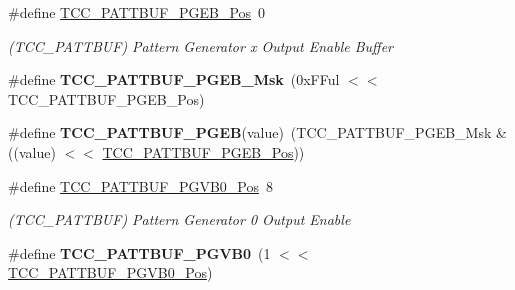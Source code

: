 \begin{DoxyCompactItemize}
\item 
\hypertarget{group___s_a_m_l21___t_c_c_gacee63a425f926cec1b7bbb7d34ebac7e}{}\#define \hyperlink{group___s_a_m_l21___t_c_c_gacee63a425f926cec1b7bbb7d34ebac7e}{T\+C\+C\+\_\+\+P\+A\+T\+T\+B\+U\+F\+\_\+\+P\+G\+E\+B\+\_\+\+Pos}~0\label{group___s_a_m_l21___t_c_c_gacee63a425f926cec1b7bbb7d34ebac7e}

\begin{DoxyCompactList}\small\item\em (T\+C\+C\+\_\+\+P\+A\+T\+T\+B\+U\+F) Pattern Generator x Output Enable Buffer \end{DoxyCompactList}\item 
\hypertarget{group___s_a_m_l21___t_c_c_ga2c604d0b655c841d75ea4f18541478d3}{}\#define {\bfseries T\+C\+C\+\_\+\+P\+A\+T\+T\+B\+U\+F\+\_\+\+P\+G\+E\+B\+\_\+\+Msk}~(0x\+F\+Ful $<$$<$ T\+C\+C\+\_\+\+P\+A\+T\+T\+B\+U\+F\+\_\+\+P\+G\+E\+B\+\_\+\+Pos)\label{group___s_a_m_l21___t_c_c_ga2c604d0b655c841d75ea4f18541478d3}

\item 
\hypertarget{group___s_a_m_l21___t_c_c_ga029a65292090a7a89837790ae08a4329}{}\#define {\bfseries T\+C\+C\+\_\+\+P\+A\+T\+T\+B\+U\+F\+\_\+\+P\+G\+E\+B}(value)~(T\+C\+C\+\_\+\+P\+A\+T\+T\+B\+U\+F\+\_\+\+P\+G\+E\+B\+\_\+\+Msk \& ((value) $<$$<$ \hyperlink{group___s_a_m_l21___t_c_c_gacee63a425f926cec1b7bbb7d34ebac7e}{T\+C\+C\+\_\+\+P\+A\+T\+T\+B\+U\+F\+\_\+\+P\+G\+E\+B\+\_\+\+Pos}))\label{group___s_a_m_l21___t_c_c_ga029a65292090a7a89837790ae08a4329}

\item 
\hypertarget{group___s_a_m_l21___t_c_c_gaa0c420adcd4908d83014eda1a323723b}{}\#define \hyperlink{group___s_a_m_l21___t_c_c_gaa0c420adcd4908d83014eda1a323723b}{T\+C\+C\+\_\+\+P\+A\+T\+T\+B\+U\+F\+\_\+\+P\+G\+V\+B0\+\_\+\+Pos}~8\label{group___s_a_m_l21___t_c_c_gaa0c420adcd4908d83014eda1a323723b}

\begin{DoxyCompactList}\small\item\em (T\+C\+C\+\_\+\+P\+A\+T\+T\+B\+U\+F) Pattern Generator 0 Output Enable \end{DoxyCompactList}\item 
\hypertarget{group___s_a_m_l21___t_c_c_ga06cd304df61ef7ed247e1a480dbba7ca}{}\#define {\bfseries T\+C\+C\+\_\+\+P\+A\+T\+T\+B\+U\+F\+\_\+\+P\+G\+V\+B0}~(1 $<$$<$ \hyperlink{group___s_a_m_l21___t_c_c_gaa0c420adcd4908d83014eda1a323723b}{T\+C\+C\+\_\+\+P\+A\+T\+T\+B\+U\+F\+\_\+\+P\+G\+V\+B0\+\_\+\+Pos})\label{group___s_a_m_l21___t_c_c_ga06cd304df61ef7ed247e1a480dbba7ca}


\end{DoxyCompactItemize}
